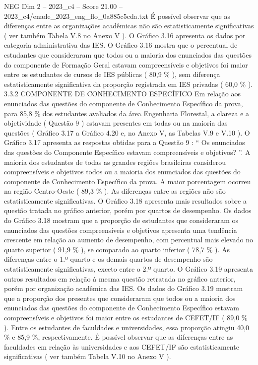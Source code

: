 \begin{textsample}{NEG Dim 2 – 2023\_c4 – Score 21.00 – 2023\_c4/enade\_2023\_eng\_flo\_0a885c5cda.txt}
É possível observar que as diferenças entre as organizações acadêmicas não são estatisticamente significativas ( ver também Tabela V.8 no Anexo V ).
O Gráfico 3.16 apresenta os dados por categoria administrativa das IES.
O Gráfico 3.16 mostra que o percentual de estudantes que consideraram que todos ou a maioria dos enunciados das questões do componente de Formação Geral estavam compreensíveis e objetivos foi maior entre os estudantes de cursos de IES públicas ( 80,9 \% ), sem diferença estatisticamente significativa da proporção registrada em IES privadas ( 60,0 \% ). 3.3.2 COMPONENTE DE CONHECIMENTO ESPECÍFICO Em relação aos enunciados das questões do componente de Conhecimento Específico da prova, para 85,8 \% dos estudantes avaliados da área Engenharia Florestal, a clareza e a objetividade ( Questão 9 ) estavam presentes em todas ou na maioria das questões ( Gráfico 3.17 a Gráfico 4.20 e, no Anexo V, as Tabelas V.9 e V.10 ).
O Gráfico 3.17 apresenta as respostas obtidas para a Questão 9 : “ Os enunciados das questões do Componente Específico estavam compreensíveis e objetivos? ”.
A maioria dos estudantes de todas as grandes regiões brasileiras considerou compreensíveis e objetivos todos ou a maioria dos enunciados das questões do componente de Conhecimento Específico da prova.
A maior porcentagem ocorreu na região Centro-Oeste ( 89,3 \% ).
As diferenças entre as regiões não são estatisticamente significativas.
O Gráfico 3.18 apresenta mais resultados sobre a questão tratada no gráfico anterior, porém por quartos de desempenho.
Os dados do Gráfico 3.18 mostram que a proporção de estudantes que consideraram os enunciados das questões compreensíveis e objetivos apresenta uma tendência crescente em relação ao aumento de desempenho, com percentual mais elevado no quarto superior ( 91,9 \% ), se comparado ao quarto inferior ( 78,7 \% ).
As diferenças entre o 1.º quarto e os demais quartos de desempenho são estatisticamente significativas, exceto entre o 2.º quarto.
O Gráfico 3.19 apresenta outros resultados em relação à mesma questão retratada no gráfico anterior, porém por organização acadêmica das IES.
Os dados do Gráfico 3.19 mostram que a proporção dos presentes que consideraram que todos ou a maioria dos enunciados das questões do componente de Conhecimento Específico estavam compreensíveis e objetivos foi maior entre os estudantes de CEFET/IF ( 89,0 \% ).
Entre os estudantes de faculdades e universidades, essa proporção atingiu 40,0 \% e 85,9 \%, respectivamente.
É possível observar que as diferenças entre as faculdades em relação às universidades e aos CEFET/IF são estatisticamente significativas ( ver também Tabela V.10 no Anexo V ).

\end{textsample}
